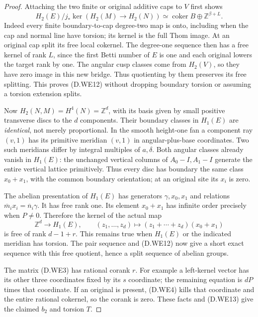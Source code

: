 \begin{proof}
Attaching the two finite or original additive caps
to $V$ first shows
\[
 H_2(E)/j_*\ker(H_2(M)\to H_2(N))
 \simeq\operatorname{coker}B\oplus\mathbb Z^{\beta+L}.
                                                               \tag{D.WE12}
\]
Indeed every finite boundary-to-cap degree-two map
is onto, including when the cap and normal line
have torsion; its kernel is the full Thom image.
At an original cap split its free local cokernel.
The degree-one sequence then has a free kernel of
rank $L$, since the first Betti number of $E$ is
one and each original lowers the target rank by one.
The angular cusp classes come from $H_2(V)$, so
they have zero image in this new bridge. Thus
quotienting by them preserves its free splitting.
This proves (D.WE12) without dropping boundary
torsion or assuming a torsion extension splits.

Now $H_2(N,M)=H^4(N)=\mathbb Z^d$, with its basis
given by small positive transverse discs to the
$d$ components. Their boundary classes in $H_1(E)$
are \emph{identical}, not merely proportional.
In the smooth height-one fan a component ray
$(v,1)$ has its primitive meridian $(v,1)$ in
angular-plus-base coordinates. Two such meridians
differ by integral multiples of $a,\delta$.
Both angular classes already vanish in $H_1(E)$:
the unchanged vertical columns of $A_0-I,A_1-I$
generate the entire vertical lattice primitively.
Thus every disc has boundary the same class
$x_0+x_1$, with the common boundary orientation;
at an original site its $x_i$ is zero.

The abelian presentation of $H_1(E)$ has generators
$\gamma,x_0,x_1$ and relations
$\overline m_i x_i=\overline n_i\gamma$.
It has free rank one. Its element $x_0+x_1$ has
infinite order precisely when $P\ne0$.
Therefore the kernel of the actual map
\[
 \mathbb Z^d\longrightarrow H_1(E),\qquad
 (z_1,\ldots,z_d)\longmapsto
                 (z_1+\cdots+z_d)(x_0+x_1)
                                                               \tag{D.WE13}
\]
is free of rank $d-1+r$. This remains true when
$H_1(E)$ or the indicated meridian has torsion.
The pair sequence and (D.WE12) now give a short
exact sequence with this free quotient, hence a
split sequence of abelian groups.

The matrix (D.WE3) has rational corank $r$.
For example a left-kernel vector has its other
three coordinates fixed by its $s$ coordinate;
the remaining equation is $dP$ times that coordinate.
If an original is present, (D.WE4) kills that
coordinate and the entire rational cokernel, so
the corank is zero. These facts and (D.WE13) give
the claimed $b_2$ and torsion $T$.


\end{proof}
